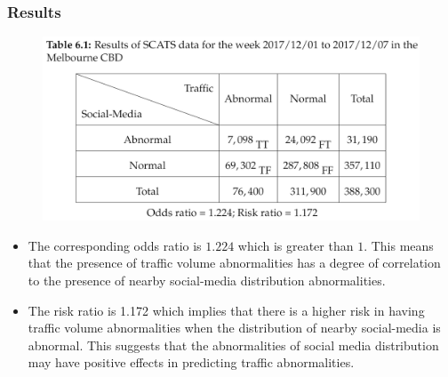 \begin{frame}
    \frametitle{Results}
    \begin{figure}
        \centering
        \includegraphics[width=0.7\columnwidth]{resource/figures/odds_ratio.png}
    \end{figure}
    \vspace{-0.2cm}
    \begin{itemize} \tiny
        \item The corresponding odds ratio is $1.224$ which is greater than $1$. This means that the presence of traffic volume abnormalities has a degree of correlation to the presence of nearby social-media distribution abnormalities.
        \item The risk ratio is 1.172 which implies that there is a higher risk in having traffic volume abnormalities when the distribution of nearby social-media is abnormal. This suggests that the abnormalities of social media distribution may have positive effects in predicting traffic abnormalities.
    \end{itemize}
\end{frame}

